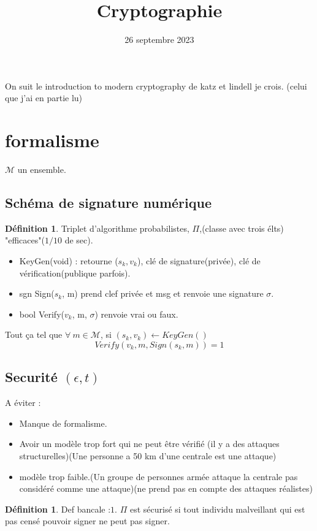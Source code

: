 \documentclass[12pt]{article}
\title{Cryptographie}
\date{26 septembre 2023}
\theoremstyle{plain}
\theoremstyle{definition}
\newtheorem{defn}[subsubsection]{D\'efinition}
\theoremstyle{remark}
\newcommand{\M}{\mathcal{M}}
\begin{document}
\maketitle

On suit le introduction to modern cryptography de katz et lindell je crois. (celui que j'ai en partie lu)

\section{formalisme}
$\M$ un ensemble.

\subsection{Schéma de signature numérique}
\begin{defn}
    Triplet d'algorithme probabilistes, $\Pi$,(classe avec trois élts) "efficaces"($1/10$ de sec).
\end{defn}

\begin{itemize}
    \item KeyGen(void) : retourne ($s_k,v_k$), clé de signature(privée), clé de vérification(publique parfois).
    \item sgn Sign($s_k$, m) prend clef privée et msg et renvoie une signature $\sigma$.
    \item bool Verify($v_k$, m, $\sigma$) renvoie vrai ou faux.
\end{itemize}

Tout ça tel que $\forall~m\in\M$, si $(s_k,v_k)\leftarrow KeyGen()$
$$Verify(v_k, m, Sign(s_k,m))=1$$


\subsection{Securité $(\epsilon, t)$}
A éviter :
\begin{itemize}
    \item Manque de formalisme.
    \item Avoir un modèle trop fort qui ne peut être vérifié (il y a des attaques structurelles)(Une personne a 50 km d'une centrale est une attaque)
    \item modèle trop faible.(Un groupe de personnes armée attaque la centrale pas considéré comme une attaque)(ne prend pas en compte des attaques réalistes)
\end{itemize}

\begin{defn}
    Def bancale :$1.$ $\Pi$ est sécurisé si tout individu malveillant qui est pas censé pouvoir signer ne peut pas signer.
\end{defn}
\end{document}

